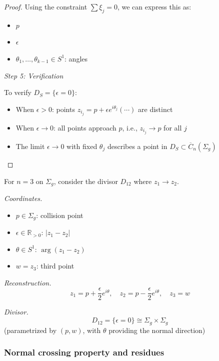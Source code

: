 \begin{proof}
Using the constraint $\sum \xi_j = 0$, we can express this as:
\begin{itemize}
\item $p$
\item $\epsilon$
\item $\theta_1, \ldots, \theta_{k-1} \in S^1$: angles
\end{itemize}

\medskip
\noindent\emph{Step 5: Verification}

To verify $D_S = \{\epsilon = 0\}$:
\begin{itemize}
\item When $\epsilon > 0$: points $z_{i_j} = p + \epsilon e^{i\theta_j} (\cdots)$ are distinct
\item When $\epsilon \to 0$: all points approach $p$, i.e., $z_{i_j} \to p$ for all $j$
\item The limit $\epsilon \to 0$ with fixed $\theta_j$ describes a point in $D_S \subset \overline{C}_n(\Sigma_g)$
\end{itemize}
\end{proof}

\begin{example}\label{ex:three-points-coords}
For $n=3$ on $\Sigma_g$, consider the divisor $D_{12}$ where $z_1 \to z_2$.

\emph{Coordinates.}
\begin{itemize}
\item $p \in \Sigma_g$: collision point
\item $\epsilon \in \mathbb{R}_{>0}$: $|z_1 - z_2|$
\item $\theta \in S^1$: $\arg(z_1 - z_2)$
\item $w = z_3$: third point
\end{itemize}

\emph{Reconstruction.}
\[z_1 = p + \frac{\epsilon}{2}e^{i\theta}, \quad z_2 = p - \frac{\epsilon}{2}e^{i\theta}, \quad z_3 = w\]

\emph{Divisor.}
\[D_{12} = \{\epsilon = 0\} \cong \Sigma_g \times \Sigma_g\]
(parametrized by $(p,w)$, with $\theta$ providing the normal direction)
\end{example}

\subsubsection{Normal crossing property and residues}

